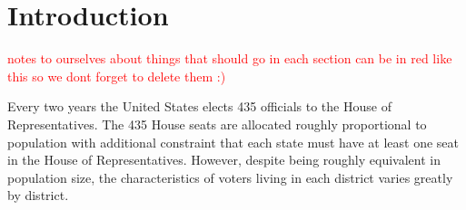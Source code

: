 \documentclass[12pt]{article}
\begin{document}









\section{Introduction}


\textcolor{red}{notes to ourselves about things that should go in each section can be in red like this so we dont forget to delete them :)}

Every two years the United States elects 435 officials to the House of Representatives. The 435 House seats are allocated roughly proportional to population with additional constraint that each state must have at least one seat in the House of Representatives. However, despite being roughly equivalent in population size, the characteristics of voters living in each district varies greatly by district.
\end{document}
